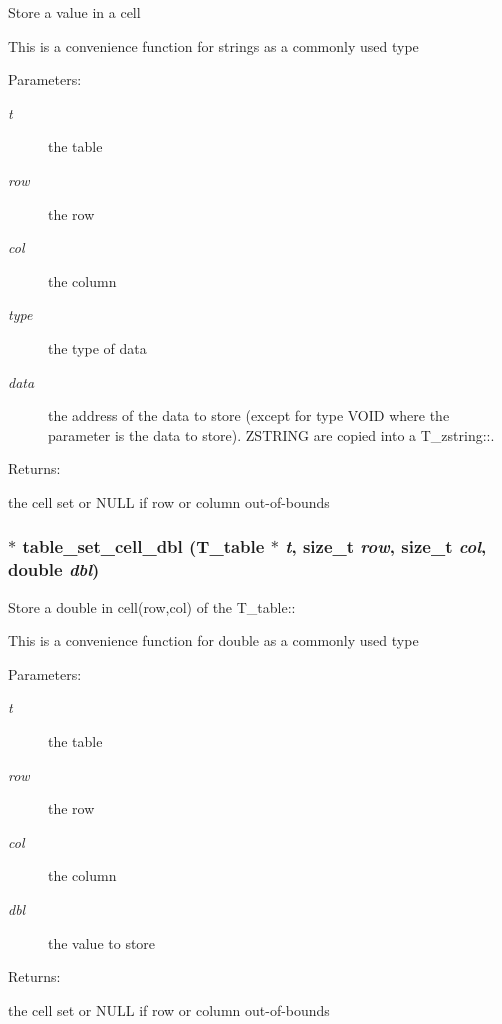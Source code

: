 Store a value in a cell

This is a convenience function for strings as a commonly used type\begin{Desc}
\item[Parameters: ]\par
\begin{description}
\item[{\em 
t}]the table \item[{\em 
row}]the row \item[{\em 
col}]the column \item[{\em 
type}]the type of data \item[{\em 
data}]the address of the data to store (except for type VOID where the parameter is the data to store). ZSTRING are copied into a T\_\-zstring::.\end{description}
\end{Desc}
\begin{Desc}
\item[Returns: ]\par
the cell set or NULL if row or column out-of-bounds \end{Desc}
\subsubsection{$\ast$ table\_\-set\_\-cell\_\-dbl ({\bf T\_\-table} $\ast$ {\em t}, size\_\-t {\em row}, size\_\-t {\em col}, double {\em dbl})}\label{group__simple__table_a9}


Store a double in cell(row,col) of the T\_\-table::

This is a convenience function for double as a commonly used type\begin{Desc}
\item[Parameters: ]\par
\begin{description}
\item[{\em 
t}]the table \item[{\em 
row}]the row \item[{\em 
col}]the column \item[{\em 
dbl}]the value to store\end{description}
\end{Desc}
\begin{Desc}
\item[Returns: ]\par
the cell set or NULL if row or column out-of-bounds \end{Desc}
